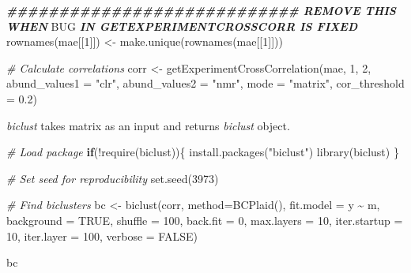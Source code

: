 \documentclass[
]{book}
\newenvironment{Shaded}{\begin{snugshade}}{\end{snugshade}}
\newcommand{\AlertTok}[1]{\textcolor[rgb]{0.94,0.16,0.16}{#1}}
\newcommand{\AttributeTok}[1]{\textcolor[rgb]{0.77,0.63,0.00}{#1}}
\newcommand{\CommentTok}[1]{\textcolor[rgb]{0.56,0.35,0.01}{\textit{#1}}}
\newcommand{\ConstantTok}[1]{\textcolor[rgb]{0.00,0.00,0.00}{#1}}
\newcommand{\ControlFlowTok}[1]{\textcolor[rgb]{0.13,0.29,0.53}{\textbf{#1}}}
\newcommand{\DecValTok}[1]{\textcolor[rgb]{0.00,0.00,0.81}{#1}}
\newcommand{\DocumentationTok}[1]{\textcolor[rgb]{0.56,0.35,0.01}{\textbf{\textit{#1}}}}
\newcommand{\FloatTok}[1]{\textcolor[rgb]{0.00,0.00,0.81}{#1}}
\newcommand{\FunctionTok}[1]{\textcolor[rgb]{0.00,0.00,0.00}{#1}}
\newcommand{\NormalTok}[1]{#1}
\newcommand{\OtherTok}[1]{\textcolor[rgb]{0.56,0.35,0.01}{#1}}
\newcommand{\SpecialCharTok}[1]{\textcolor[rgb]{0.00,0.00,0.00}{#1}}
\newcommand{\StringTok}[1]{\textcolor[rgb]{0.31,0.60,0.02}{#1}}
\begin{document}
\begin{Shaded}
\begin{Highlighting}[]
\DocumentationTok{\#\#\#\#\#\#\#\#\#\#\#\#\#\#\#\#\#\#\#\#\#\#\#\#\#\#\#\# REMOVE THIS WHEN }\AlertTok{BUG}\DocumentationTok{ IN GETEXPERIMENTCROSSCORR IS FIXED}
\FunctionTok{rownames}\NormalTok{(mae[[}\DecValTok{1}\NormalTok{]]) }\OtherTok{\textless{}{-}} \FunctionTok{make.unique}\NormalTok{(}\FunctionTok{rownames}\NormalTok{(mae[[}\DecValTok{1}\NormalTok{]]))}

\CommentTok{\# Calculate correlations}
\NormalTok{corr }\OtherTok{\textless{}{-}} \FunctionTok{getExperimentCrossCorrelation}\NormalTok{(mae, }\DecValTok{1}\NormalTok{, }\DecValTok{2}\NormalTok{, }
                                      \AttributeTok{abund\_values1 =} \StringTok{"clr"}\NormalTok{, }
                                      \AttributeTok{abund\_values2 =} \StringTok{"nmr"}\NormalTok{, }
                                      \AttributeTok{mode =} \StringTok{"matrix"}\NormalTok{, }
                                      \AttributeTok{cor\_threshold =} \FloatTok{0.2}\NormalTok{)}
\end{Highlighting}
\end{Shaded}

\emph{biclust} takes matrix as an input and returns \emph{biclust} object.

\begin{Shaded}
\begin{Highlighting}[]
\CommentTok{\# Load package}
\ControlFlowTok{if}\NormalTok{(}\SpecialCharTok{!}\FunctionTok{require}\NormalTok{(biclust))\{}
    \FunctionTok{install.packages}\NormalTok{(}\StringTok{"biclust"}\NormalTok{)}
    \FunctionTok{library}\NormalTok{(biclust)}
\NormalTok{\}}

\CommentTok{\# Set seed for reproducibility}
\FunctionTok{set.seed}\NormalTok{(}\DecValTok{3973}\NormalTok{)}

\CommentTok{\# Find biclusters}
\NormalTok{bc }\OtherTok{\textless{}{-}} \FunctionTok{biclust}\NormalTok{(corr, }\AttributeTok{method=}\FunctionTok{BCPlaid}\NormalTok{(), }\AttributeTok{fit.model =}\NormalTok{ y }\SpecialCharTok{\textasciitilde{}}\NormalTok{ m,}
              \AttributeTok{background =} \ConstantTok{TRUE}\NormalTok{, }\AttributeTok{shuffle =} \DecValTok{100}\NormalTok{, }\AttributeTok{back.fit =} \DecValTok{0}\NormalTok{, }\AttributeTok{max.layers =} \DecValTok{10}\NormalTok{,}
              \AttributeTok{iter.startup =} \DecValTok{10}\NormalTok{, }\AttributeTok{iter.layer =} \DecValTok{100}\NormalTok{, }\AttributeTok{verbose =} \ConstantTok{FALSE}\NormalTok{)}

\NormalTok{bc}
\end{Highlighting}
\end{Shaded}
\end{document}
